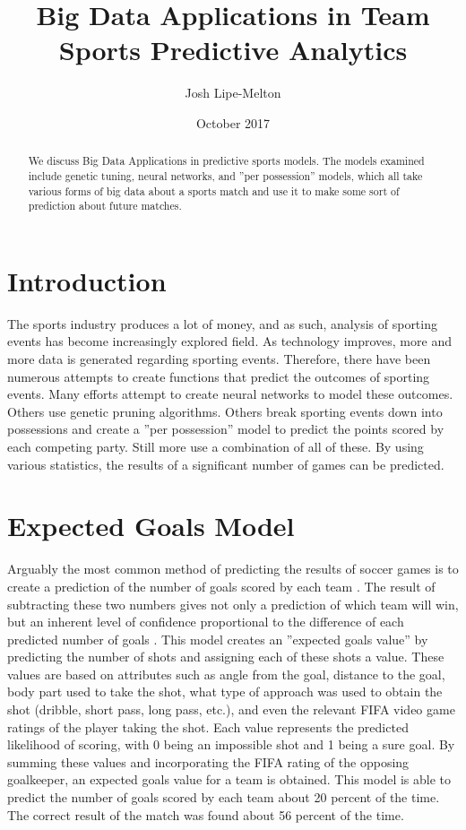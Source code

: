 \documentclass[sigconf]{acmart}
\begin{document}
\title{Big Data Applications in Team Sports Predictive Analytics}

\author{Josh Lipe-Melton}

\date{October 2017}

\begin{abstract}
We discuss Big Data Applications in predictive sports models. The models examined include genetic tuning, neural networks, and ''per possession'' models, which all take various forms of big data about a sports match and use it to make some sort of prediction about future matches.
\end{abstract}

\maketitle

\section{Introduction}
The sports industry produces a lot of money, and as such, analysis of sporting events has become increasingly explored field. As technology improves, more and more data is generated regarding sporting events. Therefore, there have been numerous attempts to create functions that predict the outcomes of sporting events. Many efforts attempt to create neural networks to model these outcomes. Others use genetic pruning algorithms. Others break sporting events down into possessions and create a ''per possession'' model to predict the points scored by each competing party. Still more use a combination of all of these. By using various statistics, the results of a significant number of games can be predicted.

\section{Expected Goals Model}
Arguably the most common method of predicting the results of soccer games is to create a prediction of the number of goals scored by each team . The result of subtracting these two numbers gives not only a prediction of which team will win, but an inherent level of confidence proportional to the difference of each predicted number of goals \cite{ExpectedGoals}. This model creates an ''expected goals value'' by predicting the number of shots and assigning each of these shots a value. These values are based on attributes such as angle from the goal, distance to the goal, body part used to take the shot, what type of approach was used to obtain the shot (dribble, short pass, long pass, etc.), and even the relevant FIFA video game ratings of the player taking the shot. Each value represents the predicted likelihood of scoring, with 0 being an impossible shot and 1 being a sure goal. By summing these values and incorporating the FIFA rating of the opposing goalkeeper, an expected goals value for a team is obtained. This model is able to predict the number of goals scored by each team about 20 percent of the time. The correct result of the match was found about 56 percent of the time\cite{ExpectedGoals}. 
\end{document}
